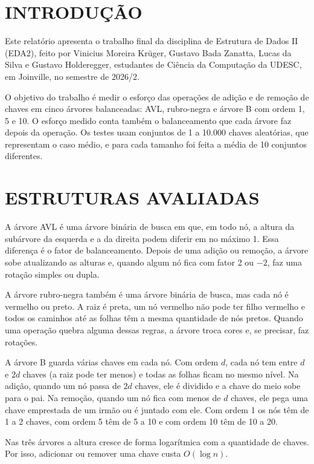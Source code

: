 \section{INTRODUÇÃO}

Este relatório apresenta o trabalho final da disciplina de Estrutura de Dados II (EDA2), feito por Vinicius Moreira Krüger, Gustavo Bada Zanatta, Lucas da Silva e Gustavo Holderegger, estudantes de Ciência da Computação da UDESC, em Joinville, no semestre de 2026/2.

O objetivo do trabalho é medir o esforço das operações de adição e de remoção de chaves em cinco árvores balanceadas: AVL, rubro-negra e árvore B com ordem 1, 5 e 10. O esforço medido conta também o balanceamento que cada árvore faz depois da operação. Os testes usam conjuntos de 1 a 10.000 chaves aleatórias, que representam o caso médio, e para cada tamanho foi feita a média de 10 conjuntos diferentes.

\section{ESTRUTURAS AVALIADAS}

A árvore AVL é uma árvore binária de busca em que, em todo nó, a altura da subárvore da esquerda e a da direita podem diferir em no máximo 1. Essa diferença é o fator de balanceamento. Depois de uma adição ou remoção, a árvore sobe atualizando as alturas e, quando algum nó fica com fator 2 ou $-2$, faz uma rotação simples ou dupla.

A árvore rubro-negra também é uma árvore binária de busca, mas cada nó é vermelho ou preto. A raiz é preta, um nó vermelho não pode ter filho vermelho e todos os caminhos até as folhas têm a mesma quantidade de nós pretos. Quando uma operação quebra alguma dessas regras, a árvore troca cores e, se precisar, faz rotações.

A árvore B guarda várias chaves em cada nó. Com ordem $d$, cada nó tem entre $d$ e $2d$ chaves (a raiz pode ter menos) e todas as folhas ficam no mesmo nível. Na adição, quando um nó passa de $2d$ chaves, ele é dividido e a chave do meio sobe para o pai. Na remoção, quando um nó fica com menos de $d$ chaves, ele pega uma chave emprestada de um irmão ou é juntado com ele. Com ordem 1 os nós têm de 1 a 2 chaves, com ordem 5 têm de 5 a 10 e com ordem 10 têm de 10 a 20.

Nas três árvores a altura cresce de forma logarítmica com a quantidade de chaves. Por isso, adicionar ou remover uma chave custa $O(\log n)$.

